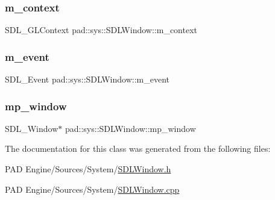 \subsubsection{\texorpdfstring{m\+\_\+context}{m\_context}}
{\footnotesize\ttfamily S\+D\+L\+\_\+\+G\+L\+Context pad\+::sys\+::\+S\+D\+L\+Window\+::m\+\_\+context\hspace{0.3cm}{\ttfamily [private]}}

\mbox{\label{classpad_1_1sys_1_1_s_d_l_window_a98bb97af76c295e146a2237147150545}} 
\subsubsection{\texorpdfstring{m\+\_\+event}{m\_event}}
{\footnotesize\ttfamily S\+D\+L\+\_\+\+Event pad\+::sys\+::\+S\+D\+L\+Window\+::m\+\_\+event\hspace{0.3cm}{\ttfamily [private]}}

\mbox{\label{classpad_1_1sys_1_1_s_d_l_window_a9ca166466e5306a205a3448d4199ec4f}} 
\subsubsection{\texorpdfstring{mp\+\_\+window}{mp\_window}}
{\footnotesize\ttfamily S\+D\+L\+\_\+\+Window$\ast$ pad\+::sys\+::\+S\+D\+L\+Window\+::mp\+\_\+window\hspace{0.3cm}{\ttfamily [private]}}



The documentation for this class was generated from the following files\+:\begin{DoxyCompactItemize}
\item 
P\+A\+D Engine/\+Sources/\+System/\mbox{\hyperlink{_s_d_l_window_8h}{S\+D\+L\+Window.\+h}}\item 
P\+A\+D Engine/\+Sources/\+System/\mbox{\hyperlink{_s_d_l_window_8cpp}{S\+D\+L\+Window.\+cpp}}\end{DoxyCompactItemize}
